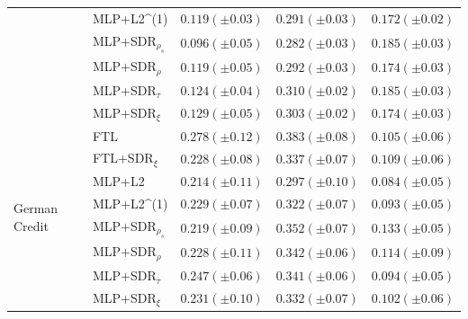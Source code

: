 \begin{tabular}{lllll}
 & MLP+L2^{(1)} & $0.119 (\pm0.03)$ & $0.291 (\pm0.03)$ & $0.172 (\pm0.02)$ \\
 & MLP+SDR$_{\rho_s}$ & $0.096 (\pm0.05)$ & $0.282 (\pm0.03)$ & $0.185 (\pm0.03)$ \\
 & MLP+SDR$_{\rho}$ & $0.119 (\pm0.05)$ & $0.292 (\pm0.03)$ & $0.174 (\pm0.03)$ \\
 & MLP+SDR$_{\tau}$ & $0.124 (\pm0.04)$ & $0.310 (\pm0.02)$ & $0.185 (\pm0.03)$ \\
 & MLP+SDR$_{\xi}$ & $0.129 (\pm0.05)$ & $0.303 (\pm0.02)$ & $0.174 (\pm0.03)$ \\
\cline{1-5}
\multirow[t]{8}{*}{German Credit} & FTL & $0.278 (\pm0.12)$ & $0.383 (\pm0.08)$ & $0.105 (\pm0.06)$ \\
 & FTL+SDR$_{\xi}$ & $0.228 (\pm0.08)$ & $0.337 (\pm0.07)$ & $0.109 (\pm0.06)$ \\
 & MLP+L2 & $0.214 (\pm0.11)$ & $0.297 (\pm0.10)$ & $0.084 (\pm0.05)$ \\
 & MLP+L2^{(1)} & $0.229 (\pm0.07)$ & $0.322 (\pm0.07)$ & $0.093 (\pm0.05)$ \\
 & MLP+SDR$_{\rho_s}$ & $0.219 (\pm0.09)$ & $0.352 (\pm0.07)$ & $0.133 (\pm0.05)$ \\
 & MLP+SDR$_{\rho}$ & $0.228 (\pm0.11)$ & $0.342 (\pm0.06)$ & $0.114 (\pm0.09)$ \\
 & MLP+SDR$_{\tau}$ & $0.247 (\pm0.06)$ & $0.341 (\pm0.06)$ & $0.094 (\pm0.05)$ \\
 & MLP+SDR$_{\xi}$ & $0.231 (\pm0.10)$ & $0.332 (\pm0.07)$ & $0.102 (\pm0.06)$ \\
\cline{1-5}
\bottomrule
\end{tabular}
